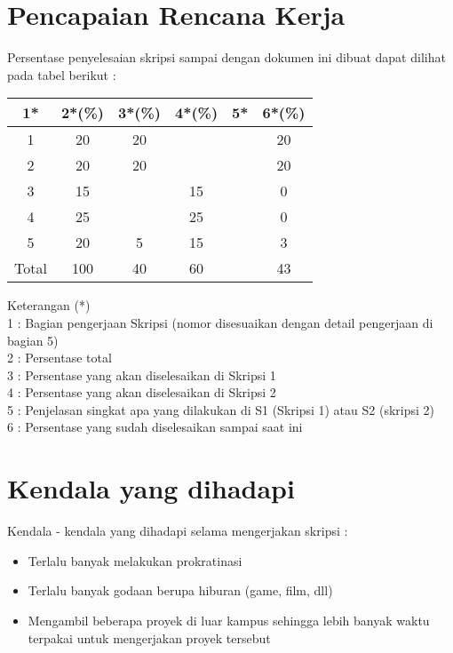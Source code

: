 \documentclass[a4paper,twoside]{article}
\begin{document}
\section{Pencapaian Rencana Kerja}
Persentase penyelesaian skripsi sampai dengan dokumen ini dibuat dapat dilihat pada tabel berikut :

\begin{center}
  \begin{tabular}{ | c | c | c | c | l | c |}
    \hline
    1*  & 2*(\%) & 3*(\%) & 4*(\%) &5* &6*(\%)\\ \hline \hline
    1   & 20  & 20  &  &  & 20 \\ \hline
    2   & 20 & 20  &   &  & 20 \\ \hline
    3   & 15  &   & 15 &  & 0 \\ \hline
    4   & 25  &   &  25 &  & 0 \\ \hline
    5   & 20  & 5  & 15 &  & 3 \\ \hline
    Total  & 100  & 40  & 60 &  & 43\\ \hline
                          \end{tabular}
\end{center}

Keterangan (*)\\
1 : Bagian pengerjaan Skripsi (nomor disesuaikan dengan detail pengerjaan di bagian 5)\\
2 : Persentase total \\
3 : Persentase yang akan diselesaikan di Skripsi 1 \\
4 : Persentase yang akan diselesaikan di Skripsi 2 \\
5 : Penjelasan singkat apa yang dilakukan di S1 (Skripsi 1) atau S2 (skripsi 2)\\
6 : Persentase yang sudah diselesaikan sampai saat ini 

\section{Kendala yang dihadapi}
Kendala - kendala yang dihadapi selama mengerjakan skripsi :
\begin{itemize}
	\item Terlalu banyak melakukan prokratinasi
	\item Terlalu banyak godaan berupa hiburan (game, film, dll)
	\item Mengambil beberapa proyek di luar kampus sehingga lebih banyak waktu terpakai untuk mengerjakan proyek tersebut
\end{itemize}
\end{document}
